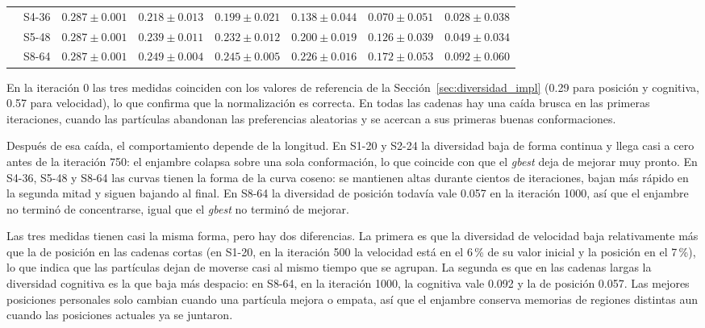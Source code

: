 \begin{table}[H]
\begin{adjustbox}{max width=\textwidth}
\begin{tabular}{llcccccc}
 & S4-36 & $0.287 \pm 0.001$ & $0.218 \pm 0.013$ & $0.199 \pm 0.021$ & $0.138 \pm 0.044$ & $0.070 \pm 0.051$ & $0.028 \pm 0.038$ \\
 & S5-48 & $0.287 \pm 0.001$ & $0.239 \pm 0.011$ & $0.232 \pm 0.012$ & $0.200 \pm 0.019$ & $0.126 \pm 0.039$ & $0.049 \pm 0.034$ \\
 & S8-64 & $0.287 \pm 0.001$ & $0.249 \pm 0.004$ & $0.245 \pm 0.005$ & $0.226 \pm 0.016$ & $0.172 \pm 0.053$ & $0.092 \pm 0.060$ \\
\bottomrule
\end{tabular}
\end{adjustbox}
\end{table}

En la iteración 0 las tres medidas coinciden con los valores de referencia de la Sección~\ref{sec:diversidad_impl} (0.29 para posición y cognitiva, 0.57 para velocidad), lo que confirma que la normalización es correcta. En todas las cadenas hay una caída brusca en las primeras iteraciones, cuando las partículas abandonan las preferencias aleatorias y se acercan a sus primeras buenas conformaciones.

Después de esa caída, el comportamiento depende de la longitud. En S1-20 y S2-24 la diversidad baja de forma continua y llega casi a cero antes de la iteración 750: el enjambre colapsa sobre una sola conformación, lo que coincide con que el \textit{gbest} deja de mejorar muy pronto. En S4-36, S5-48 y S8-64 las curvas tienen la forma de la curva coseno: se mantienen altas durante cientos de iteraciones, bajan más rápido en la segunda mitad y siguen bajando al final. En S8-64 la diversidad de posición todavía vale 0.057 en la iteración 1000, así que el enjambre no terminó de concentrarse, igual que el \textit{gbest} no terminó de mejorar.

Las tres medidas tienen casi la misma forma, pero hay dos diferencias. La primera es que la diversidad de velocidad baja relativamente más que la de posición en las cadenas cortas (en S1-20, en la iteración 500 la velocidad está en el 6\,\% de su valor inicial y la posición en el 7\,\%), lo que indica que las partículas dejan de moverse casi al mismo tiempo que se agrupan. La segunda es que en las cadenas largas la diversidad cognitiva es la que baja más despacio: en S8-64, en la iteración 1000, la cognitiva vale 0.092 y la de posición 0.057. Las mejores posiciones personales solo cambian cuando una partícula mejora o empata, así que el enjambre conserva memorias de regiones distintas aun cuando las posiciones actuales ya se juntaron.

